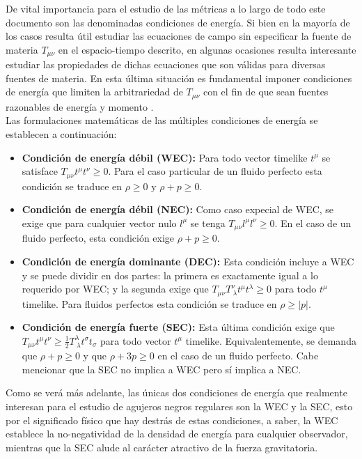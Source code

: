 \documentclass{article}
\numberwithin{equation}{section}
\theoremstyle{definition}
\begin{document}
De vital importancia para el estudio de las métricas a lo largo de todo este documento son las denominadas condiciones de energía. Si bien en la mayoría de los casos resulta útil estudiar las ecuaciones de campo sin especificar la fuente de materia $T_{\mu \nu}$ en el espacio-tiempo descrito, en algunas ocasiones resulta interesante estudiar las propiedades de dichas ecuaciones que son válidas para diversas fuentes de materia. En esta última situación es fundamental imponer condiciones de energía que limiten la arbitrariedad de $T_{\mu \nu}$ con el fin de que sean fuentes razonables de energía y momento \cite{carroll}.\\

Las formulaciones matemáticas de las múltiples  condiciones de energía se establecen a continuación:

\begin{itemize}
\item \textbf{Condición de energía débil (WEC):} Para todo vector timelike $t^\mu$ se satisface $T_{\mu \nu}t^{\mu}t^{\nu} \geq 0$. Para el caso particular de un fluido perfecto esta condición se traduce en $\rho \geq 0$ y $\rho + p \geq 0$.

\item \textbf{Condición de energía débil (NEC):} Como caso expecial de WEC, se exige que para cualquier vector nulo $l^\mu$ se tenga $T_{\mu \nu}l^{\mu}l^{\nu} \geq 0$. En el caso de un fluido perfecto, esta condición exige $\rho + p \geq 0$.

\item \textbf{Condición de energía dominante (DEC):} Esta condición incluye a WEC y se puede dividir en dos partes: la primera es exactamente igual a lo requerido por WEC; y la segunda exige que $T_{\mu \nu}T^{\nu}_{\ \lambda}t^{\mu}t^{\lambda} \geq 0$ para todo $t^{\mu}$ timelike. Para fluidos perfectos esta condición se traduce en $\rho \geq |p|$.

\item \textbf{Condición de energía fuerte (SEC):} Esta última condición exige que $T_{\mu \nu}t^{\mu}t^{\nu} \geq \frac{1}{2}T^{\lambda}_{\ \lambda}t^{\sigma}t_{\sigma}$ para todo vector $t^\mu$ timelike. Equivalentemente, se demanda que $\rho + p \geq 0$ y que $\rho + 3p \geq 0$ en el caso de un fluido perfecto. Cabe mencionar que la SEC no implica a WEC pero sí implica a NEC.
\end{itemize}

Como se verá más adelante, las únicas dos condiciones de energía que realmente interesan para el estudio de agujeros negros regulares son la WEC y la SEC, esto por el significado físico que hay destrás de estas condiciones, a saber, la WEC establece la no-negatividad de la densidad de energía para cualquier observador, mientras que la SEC alude al carácter atractivo de la fuerza gravitatoria.\\
\end{document}
